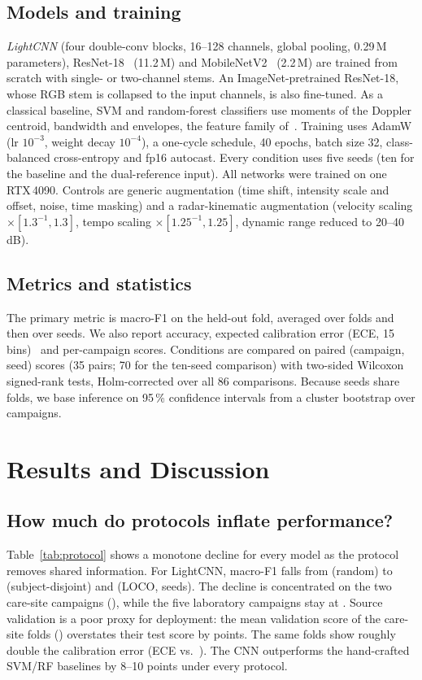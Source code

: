 \documentclass[11pt,a4paper]{article}
\begin{document}
\subsection{Models and training}
\emph{LightCNN} (four double-conv blocks, 16--128 channels, global pooling, 0.29\,M parameters), ResNet-18~\cite{he2016resnet} (11.2\,M) and MobileNetV2~\cite{sandler2018mobilenetv2} (2.2\,M) are trained from scratch with single- or two-channel stems. An ImageNet-pretrained ResNet-18, whose RGB stem is collapsed to the input channels, is also fine-tuned. As a classical baseline, SVM and random-forest classifiers use moments of the Doppler centroid, bandwidth and envelopes, the feature family of~\cite{shah2022portability}. Training uses AdamW (lr $10^{-3}$, weight decay $10^{-4}$), a one-cycle schedule, 40 epochs, batch size 32, class-balanced cross-entropy and fp16 autocast. Every condition uses five seeds (ten for the baseline and the dual-reference input). All networks were trained on one RTX\,4090. Controls are generic augmentation (time shift, intensity scale and offset, noise, time masking) and a radar-kinematic augmentation (velocity scaling $\times[1.3^{-1},1.3]$, tempo scaling $\times[1.25^{-1},1.25]$, dynamic range reduced to 20--40\,dB).

\subsection{Metrics and statistics}
The primary metric is macro-F1 on the held-out fold, averaged over folds and then over seeds. We also report accuracy, expected calibration error (ECE, 15 bins)~\cite{guo2017calibration} and per-campaign scores. Conditions are compared on paired (campaign, seed) scores (35 pairs; 70 for the ten-seed comparison) with two-sided Wilcoxon signed-rank tests, Holm-corrected over all 86 comparisons. Because seeds share folds, we base inference on 95\,\% confidence intervals from a cluster bootstrap over campaigns.

\section{Results and Discussion}\label{sec:results}



\subsection{How much do protocols inflate performance?}
Table~\ref{tab:protocol} shows a monotone decline for every model as the protocol removes shared information. For LightCNN, macro-F1 falls from \PROTRAND{} (random) to \PROTSUBJ{} (subject-disjoint) and \PROTLOCO{} (LOCO, \BASESEEDS{} seeds). The decline is concentrated on the two care-site campaigns (\PROTCARE{}), while the five laboratory campaigns stay at \PROTLAB{}. Source validation is a poor proxy for deployment: the mean validation score of the care-site folds (\VALCARE{}) overstates their test score by \VALGAP{} points. The same folds show roughly double the calibration error (ECE \ECELAB{} vs.\ \ECECARE{}). The CNN outperforms the hand-crafted SVM/RF baselines by 8--10 points under every protocol.
\end{document}

